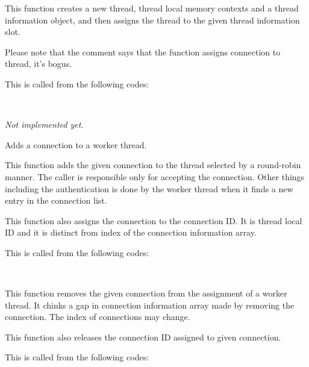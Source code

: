     This function creates a new thread, thread local memory contexts and a thread information object,
	and then assigns the thread to the given thread information slot.
    
    Please note that the comment says that the function assigns connection to thread, it's bogus.
    
    This is called from the following codes:
    
    \FuncRefHdr
		\\ \hline
    \FuncRefTrailor
  
  
    \textit{Not implemented yet.}
  
  
    Adds a connection to a worker thread.
    
    This function adds the given connection to the thread selected by a round-robin manner.
    The caller is responsible only for accepting the connection.
    Other things including the authentication is done by the worker thread when it finds a new entry in the connection list.
    
    This function also assigns the connection to the connection ID.
    It is thread local ID and it is distinct from index of the connection information array.
    
    This is called from the following codes:
    
    \FuncRefHdr
		\\ \hline
    \FuncRefTrailor
  
  
    This function removes the given connection from the assignment of a worker thread.
    It chinks a gap in connection information array made by removing the connection.
    The index of connections may change.
    
    This function also releases the connection ID assigned to given connection.
    
    This is called from the following codes:
    
    \FuncRefHdr
		\\ \hline
    \FuncRefTrailor



